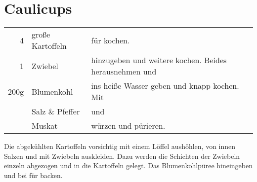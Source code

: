 \section{Caulicups}
\wip
\begin{longtable}{rlL{17.05cm}}
    4       &   große Kartoffeln    &   für  kochen.   \\
    1       &   Zwiebel             &   hinzugeben und weitere  kochen.
                                        Beides herausnehmen und \\
    200g    &   Blumenkohl          &   ins heiße Wasser geben und knapp  kochen.
                                        Mit \\
            &   Salz \& Pfeffer     &   und \\
            &   Muskat              &   würzen und pürieren.    \\
\end{longtable}
Die abgekühlten Kartoffeln vorsichtig mit einem Löffel aushöhlen, von innen Salzen und mit Zwiebeln auskleiden.
Dazu werden die Schichten der Zwiebeln einzeln abgezogen und in die Kartoffeln gelegt.
Das Blumenkohlpüree hineingeben und bei  für  backen.
